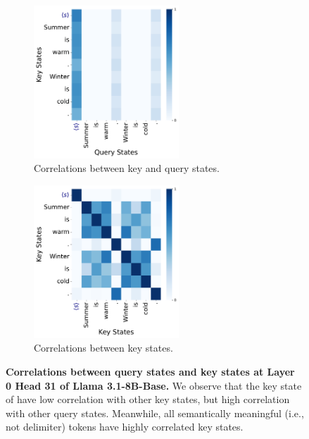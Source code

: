 \begin{figure}[h]
    \centering
    \begin{subfigure}[t]{0.4\textwidth}
    \caption{Correlations between key and query states.}
        \centering
        \includegraphics[width=0.6\textwidth]{Figures/llama_31_circuit/demo_qkt.pdf}
    \end{subfigure}
    \quad
    \begin{subfigure}[t]{0.4\textwidth}
        \centering
        \caption{Correlations between key states.}
        \includegraphics[width=0.6\textwidth]{Figures/llama_31_circuit/demo_kkt.pdf}
    \end{subfigure}
    \caption{\small \textbf{Correlations between query states and key states at Layer 0 Head 31 of Llama 3.1-8B-Base.} We observe that the key state of \bos{} have low correlation with other key states, but high correlation with other query states. Meanwhile, all semantically meaningful (i.e., not delimiter) tokens have highly correlated key states.}
    \label{fig:llama_31_qk_kk}
\end{figure}

